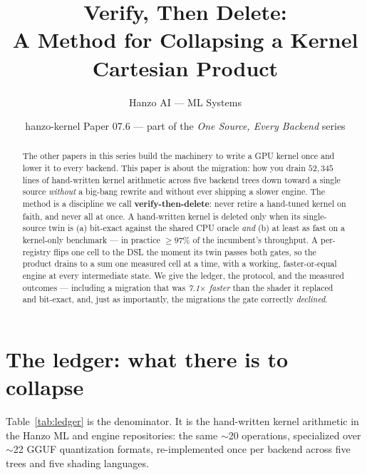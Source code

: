 \documentclass[11pt]{article}
\title{\textbf{Verify, Then Delete:\\ A Method for Collapsing a Kernel Cartesian Product}}
\author{Hanzo AI --- ML Systems}
\date{hanzo-kernel Paper 07.6 --- part of the \emph{One Source, Every Backend} series}
\begin{document}
\maketitle

\begin{abstract}
The other papers in this series build the machinery to write a GPU kernel once and lower it to every
backend. This paper is about the migration: how you drain $52{,}345$ lines of hand-written kernel
arithmetic across five backend trees down toward a single source \emph{without} a big-bang rewrite and
without ever shipping a slower engine. The method is a discipline we call \textbf{verify-then-delete}:
never retire a hand-tuned kernel on faith, and never all at once. A hand-written kernel is deleted only
when its single-source twin is (a) bit-exact against the shared CPU oracle \emph{and} (b) at least as fast
on a kernel-only benchmark --- in practice $\ge 97\%$ of the incumbent's throughput. A
per- registry flips one cell to the DSL the moment its twin passes both gates,
so the product drains to a sum one measured cell at a time, with a working, faster-or-equal engine at
every intermediate state. We give the ledger, the protocol, and the measured outcomes --- including a
migration that was \emph{7.1$\times$ faster} than the shader it replaced and bit-exact, and, just as
importantly, the migrations the gate correctly \emph{declined}.
\end{abstract}

\section{The ledger: what there is to collapse}
\label{sec:ledger}

Table~\ref{tab:ledger} is the denominator. It is the hand-written kernel arithmetic in the Hanzo ML and
engine repositories: the same $\sim$20 operations, specialized over $\sim$22 GGUF quantization formats,
re-implemented once per backend across five trees and five shading languages.
\end{document}
